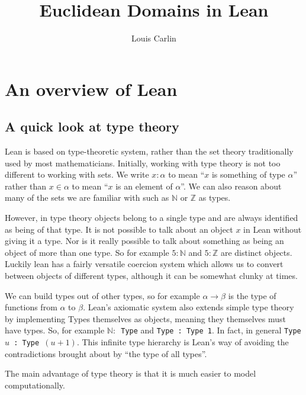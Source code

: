 \documentclass{article}
\author{Louis Carlin}
\title{Euclidean Domains in Lean}
\newcommand{\Z}{\ensuremath{\mathbb{Z}}}
\newcommand{\N}{\ensuremath{\mathbb{N}}}
\renewcommand{\a}{\alpha}
\newcommand{\ct}{\texttt}
\begin{document}
\maketitle
\newpage 


\section{An overview of Lean}

\subsection{A quick look at type theory}
Lean is based on type-theoretic system, rather than the set theory traditionally used by most mathematicians. 
Initially, working with type theory is not too different to working with sets. 
We write $x:\a$ to mean ``$x$ is something of type $\a$'' rather than $x \in \a$ to mean ``$x$ is an element of $\a$''. 
We can also reason about many of the sets we are familiar with such as $\N$ or $\Z$ as types.

However, in type theory objects belong to a single type and are always identified as being of that type.
It is not possible to talk about an object $x$ in Lean without giving it a type.
Nor is it really possible to talk about something as being an object of more than one type.
So for example $5:\N$ and $5:\Z$ are distinct objects.
Luckily lean has a fairly versatile coercion system which allows us to convert between objects of different types, although it can be somewhat clunky at times.

We can build types out of other types, so for example $\a \to \beta$ is the type of functions from $\a$ to $\beta$. 
Lean's axiomatic system also extends simple type theory by implementing Types themselves as objects, meaning they themselves must have types.
So, for example \ct{$\N:$ Type} and \ct{Type : Type 1}.
In fact, in general \ct{Type $u$ : Type $(u+1)$}. 
This infinite type hierarchy is Lean's way of avoiding the contradictions brought about by ``the type of all types''.


The main advantage of type theory is that it is much easier to model computationally.
\end{document}

